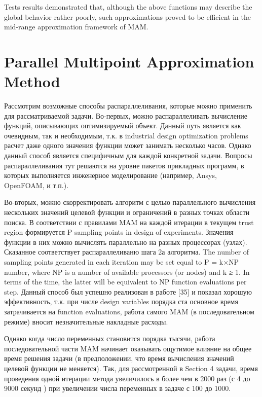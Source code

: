 \documentclass[runningheads,a4paper]{llncs}
\begin{document}
Tests results demonstrated that, although the above functions may describe the global behavior rather poorly, such approximations proved to be efficient in the mid-range approximation framework of MAM.

\section{Parallel Multipoint Approximation Method}\label{sec:par_alg}

\Russian
Рассмотрим возможные способы распараллеливания, которые можно применить для рассматриваемой задачи.
Во-первых, можно распараллеливать вычисление функций, описывающих оптимизируемый объект. Данный путь является как очевидным, так и необходимым, т.к. в industrial design optimization problems расчет даже одного значения функции может занимать несколько часов. Однако данный способ является специфичным для каждой конкретной задачи. Вопросы распараллеливания тут решаются на уровне пакетов прикладных программ, в которых выполняется инженерное моделирование (например, Ansys, OpenFOAM, и т.п.). 

Во-вторых, можно скорректировать алгоритм с целью параллельного вычисления нескольких значений целевой функции и ограничений в разных точках области поиска. В соответствии с правилами MAM на каждой итерации в текущем trust region формируется P sampling points in design of experiments. Значения функции в них можно вычислять параллельно на разных процессорах (узлах). Сказанное соответствует распараллеливаню шага 2а алгоритма. The number of sampling points generated in each iteration may be set equal to P = k×NP number, where NP is a number of available processors (or nodes) and k ≥ 1. In terms of the time, the latter will be equivalent to NP function evaluations per step. Данный способ был успешно реализован в работе [35] и показал хорошую эффективность, т.к. при числе design variables порядка ста основное время затрачивается на function evaluations, работа самого MAM (в последовательном режиме) вносит незначительные накладные расходы.

Однако когда число переменных становится порядка тысячи, работа последовательной части MAM начинает оказывать ощутимое влияние на общее время решения задачи (в предположении, что время вычисления значений целевой функции не меняется). Так, для рассмотренной в Section 4 задачи, время проведения одной итерации метода увеличилось в более чем в 2000 раз (с 4 до 9000 секунд ) при увеличении числа переменных в задаче с 100 до 1000. 
\end{document}
